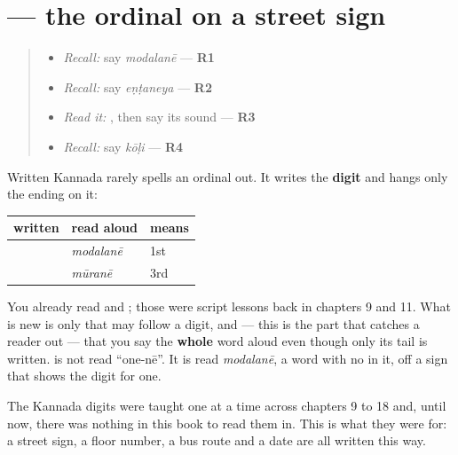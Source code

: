 \section[Practice]{ — the ordinal on a street sign}

\label{lesson:KA-C75-on-a-sign}



\begin{quote}
\begin{itemize}
\raggedright
  \item \emph{Recall:} say \emph{modalanē} — \textbf{R1}
  \item \emph{Recall:} say \emph{eṇṭaneya} — \textbf{R2}
  \item \emph{Read it:} \textbf{}, then say its sound — \textbf{R3}
  \item \emph{Recall:} say \emph{kōḷi} — \textbf{R4}
\end{itemize}
\end{quote}

\begin{grammarlens}[title={Grammar Lens: the digit does the counting for you}]
Written Kannada rarely spells an ordinal out. It writes the \textbf{digit} and hangs only the ending on it:

\noindent
\begin{tabularx}{\linewidth}{@{}>{\raggedright\arraybackslash}X>{\raggedright\arraybackslash}X>{\raggedright\arraybackslash}X@{}}
\toprule
\textbf{written} & \textbf{read aloud} & \textbf{means} \\
\midrule
\textbf{\kn{೧ನೇ}} & \emph{modalanē} & 1st \\
\textbf{\kn{೩ನೇ}} & \emph{mūranē} & 3rd \\
\bottomrule
\end{tabularx}

You already read \textbf{} and \textbf{}; those were script lessons back in chapters 9 and 11. What is new is only that \textbf{} may follow a digit, and — this is the part that catches a reader out — that you say the \textbf{whole} word aloud even though only its tail is written. \textbf{} is not read \textquotedblleft{}one-nē\textquotedblright{}. It is read \emph{modalanē}, a word with no  in it, off a sign that shows the digit for one.
\end{grammarlens}

\begin{grammarlens}[title={What you've built}]
The Kannada digits were taught one at a time across chapters 9 to 18 and, until now, there was nothing in this book to read them in. This is what they were for: a street sign, a floor number, a bus route and a date are all written this way.
\end{grammarlens}

